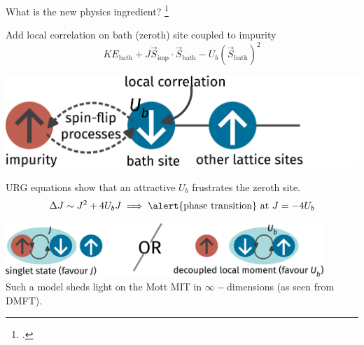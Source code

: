 \documentclass[aspectratio=169]{beamer}
\begin{document}
\begin{frame}{What is the new physics ingredient?}
\footcite{kotliar1992}
\begin{minipage}{0.39\textwidth}
	Add \alert{local correlation} on bath (zeroth) site coupled to impurity
\[KE_\text{bath} + J \vec{S}_\text{imp}\cdot\vec{S}_\text{bath} - U_b\left( \vec{S}_\text{bath} \right)^2 \]
\end{minipage}
\hspace*{\fill}
\begin{minipage}{0.55\textwidth}
\includegraphics[width=\textwidth]{zeromode_bare.pdf}
\end{minipage}

\vspace*{\fill}
URG equations show that an \alert{attractive} \(U_b\) frustrates the zeroth site.
\[\Delta J \sim J^2 + 4U_b J \implies \text{\alert{phase transition} at }J = -4U_b\]

\vspace*{\fill}
\includegraphics[width=0.9\textwidth]{frustration.pdf}\\

\vspace*{\fill}
Such a model sheds light on the Mott MIT in \(\infty-\)dimensions (as seen from DMFT).
\end{frame}
\end{document}

